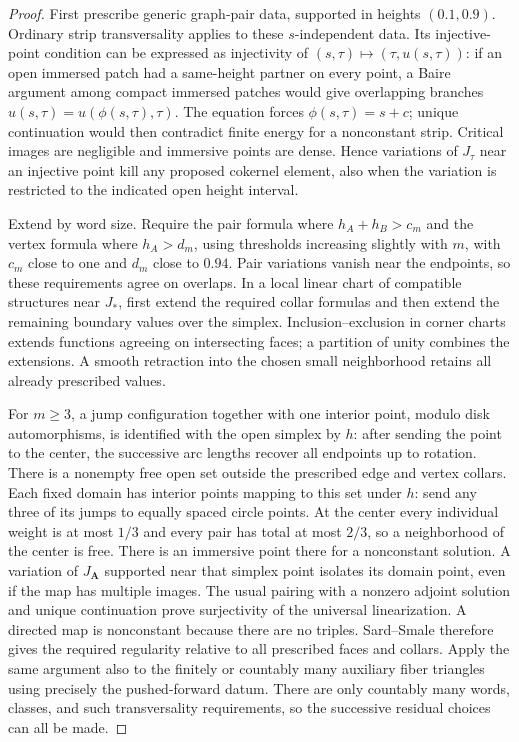 \begin{proof}
First prescribe generic graph-pair data, supported in heights
$(0.1,0.9)$.  Ordinary strip transversality applies to these
$s$-independent data.  Its injective-point condition can be expressed as
injectivity of $(s,\tau)\mapsto(\tau,u(s,\tau))$: if an open immersed
patch had a same-height partner on every point, a Baire argument among
compact immersed patches would give overlapping branches
$u(s,\tau)=u(\phi(s,\tau),\tau)$.  The equation forces
$\phi(s,\tau)=s+c$; unique continuation would then contradict finite
energy for a nonconstant strip.  Critical images are negligible and
immersive points are dense.  Hence variations of $J_\tau$ near an
injective point kill any proposed cokernel element, also when the
variation is restricted to the indicated open height interval.

Extend by word size.  Require the pair formula where
$h_A+h_B>c_m$ and the vertex formula where $h_A>d_m$, using thresholds
increasing slightly with $m$, with $c_m$ close to one and $d_m$ close to
$0.94$.  Pair variations vanish near the endpoints, so these requirements
agree on overlaps.  In a local linear chart of compatible structures
near $J_*$, first extend the required collar formulas and then extend
the remaining boundary values over the simplex.  Inclusion--exclusion
in corner charts extends functions agreeing on intersecting faces;
a partition of unity combines the extensions.  A smooth retraction
into the chosen small neighborhood retains all already prescribed
values.

For $m\geq3$, a jump configuration together with one interior point,
modulo disk automorphisms, is identified with the open simplex by $h$:
after sending the point to the center, the successive arc lengths
recover all endpoints up to rotation.  There is a nonempty free open
set outside the prescribed edge and vertex collars.  Each fixed domain
has interior points mapping to this set under $h$: send any three of
its jumps to equally spaced circle points.  At the center every
individual weight is at most $1/3$ and every pair has total at most
$2/3$, so a neighborhood of the center is free.  There is an
immersive point there for a nonconstant solution.  A variation of
$J_{\mathbf A}$ supported near that simplex point isolates its domain
point, even if the map has multiple images.  The usual pairing with a
nonzero adjoint solution and unique continuation prove surjectivity
of the universal linearization.  A directed map is nonconstant because
there are no triples.  Sard--Smale therefore gives the required
regularity relative to all prescribed faces and collars.  Apply the
same argument also to the finitely or countably many auxiliary fiber
triangles using precisely the pushed-forward datum.  There are only
countably many words, classes, and such transversality requirements,
so the successive residual choices can all be made.
\end{proof}

